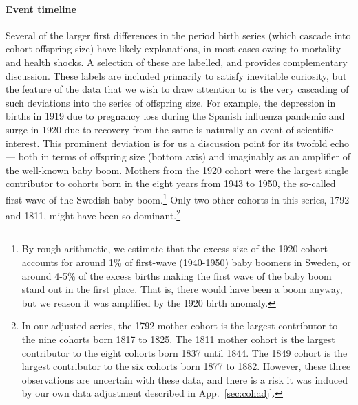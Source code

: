 \paragraph{Event timeline}
Several of the larger first differences in the period birth series (which cascade into cohort offspring size) have likely explanations, in most cases owing to mortality and health shocks. A selection of these are labelled, and \cite{utterstrom1954some} provides complementary discussion. These labels are included primarily to satisfy inevitable curiosity, but the feature of the data that we wish to draw attention to is the very cascading of such deviations into the series of offspring size. For example, the depression in births in 1919 due to pregnancy loss during the Spanish influenza pandemic and surge in 1920 due to recovery from the same \citep{BobergFazlic2017} is naturally an event of scientific interest. This prominent deviation is for us a discussion point for its twofold echo--- both in terms of offspring size (bottom axis) and imaginably as an amplifier of the well-known baby boom. Mothers from the 1920 cohort were the largest single contributor to cohorts born in the eight years from 1943 to 1950, the so-called first wave of the Swedish baby boom.\footnote{By rough arithmetic, we estimate that the excess size of the 1920 cohort accounts for around 1\% of first-wave (1940-1950) baby boomers in Sweden, or around 4-5\% of the excess births making the first wave of the baby boom stand out in the first place. That is, there would have been a boom anyway, but we reason it was amplified by the 1920 birth anomaly.} Only two other cohorts in this series, 1792 and 1811, might have been so dominant.\footnote{In our adjusted series, the 1792 mother cohort is the largest contributor to the nine cohorts born 1817 to 1825. The 1811 mother cohort is the largest contributor to the eight cohorts born 1837 until 1844. The 1849 cohort is the largest contributor to the six cohorts born 1877 to 1882. However, these three observations are uncertain with these data, and there is a risk it was induced by our own data adjustment described in App.~\ref{sec:cohadj}.}


